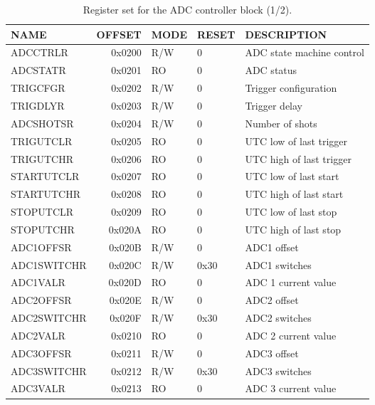 \documentclass[a4paper]{article}
\begin{document}
\begin{table}[htbp]
  \centering
  \begin{tabularx}{\textwidth}{|l|r|l|l|X|}
    \hline
    \textbf{NAME} & \textbf{OFFSET} & \textbf{MODE} & \textbf{RESET} & \textbf{DESCRIPTION} \\
    \hline
    \hline
    ADCCTRLR & 0x0200 & R/W & 0 & ADC state machine control\\
    \hline
    ADCSTATR & 0x0201 & RO & 0 & ADC status \\
    \hline
    TRIGCFGR & 0x0202 & R/W & 0 & Trigger configuration \\
    \hline
    TRIGDLYR & 0x0203 & R/W & 0 & Trigger delay \\
    \hline
    ADCSHOTSR & 0x0204 & R/W & 0 & Number of shots \\
    \hline
    TRIGUTCLR & 0x0205 & RO & 0 & UTC low of last trigger \\
    \hline
    TRIGUTCHR & 0x0206 & RO & 0 & UTC high of last trigger \\
    \hline
    STARTUTCLR & 0x0207 & RO & 0 & UTC low of last start \\
    \hline
    STARTUTCHR & 0x0208 & RO & 0 & UTC high of last start \\
    \hline
    STOPUTCLR & 0x0209 & RO & 0 & UTC low of last stop \\
    \hline
    STOPUTCHR & 0x020A & RO & 0 & UTC high of last stop \\
    \hline
    ADC1OFFSR & 0x020B & R/W & 0 & ADC1 offset \\
    \hline
    ADC1SWITCHR & 0x020C & R/W & 0x30 & ADC1 switches \\
    \hline
    ADC1VALR & 0x020D & RO & 0 & ADC 1 current value \\
    \hline
    ADC2OFFSR & 0x020E & R/W & 0 & ADC2 offset \\
    \hline
    ADC2SWITCHR & 0x020F & R/W & 0x30 & ADC2 switches \\
    \hline
    ADC2VALR & 0x0210 & RO & 0 & ADC 2 current value \\
    \hline
    ADC3OFFSR & 0x0211 & R/W & 0 & ADC3 offset \\
    \hline
    ADC3SWITCHR & 0x0212 & R/W & 0x30 & ADC3 switches \\
    \hline
    ADC3VALR & 0x0213 & RO & 0 & ADC 3 current value \\
    \hline
  \end{tabularx}
  \caption{Register set for the ADC controller block (1/2).}
  \label{tab:adc_control1}
\end{table}
\end{document}

